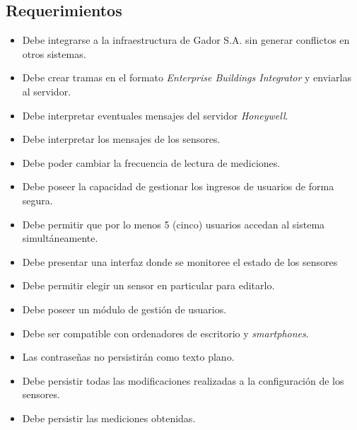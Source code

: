 	\subsection{Requerimientos}
	\label{requerimientos}
		\begin{itemize}
			\item Debe integrarse a la infraestructura de Gador S.A. sin generar conflictos en otros sistemas.
			\item Debe crear tramas en el formato \emph{Enterprise Buildings Integrator} y enviarlas al servidor.
			\item Debe interpretar eventuales mensajes del servidor \emph{Honeywell}.
			\item Debe interpretar los mensajes de los sensores.
			\item Debe poder cambiar la frecuencia de lectura de mediciones.
			\item Debe poseer la capacidad de gestionar los ingresos de usuarios de forma segura.
			\item Debe permitir que por lo menos 5 (cinco) usuarios accedan al sistema simultáneamente.
			\item Debe presentar una interfaz donde se monitoree el estado de los sensores
			\item Debe permitir elegir un sensor en particular para editarlo.
			\item Debe poseer un módulo de gestión de usuarios.
			\item Debe ser compatible con ordenadores de escritorio y \emph{smartphones}.
			\item Las contraseñas no persistirán como texto plano.
			\item Debe persistir todas las modificaciones realizadas a la configuración de los sensores.
			\item Debe persistir las mediciones obtenidas.
		\end{itemize}